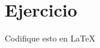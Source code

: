 \section{Ejercicio}

\begin{frame}
	\begin{block}{Codifique esto en \LaTeX}
		\begin{columns}
			\begin{column}{.3\paperwidth}
				
			\end{column}
			\begin{column}{.6\paperwidth}
				\inputminted[fontsize=\tiny,linenos,frame=single]{latex}{sections/solution2}
			\end{column}
		\end{columns}
	\end{block}
\end{frame}
